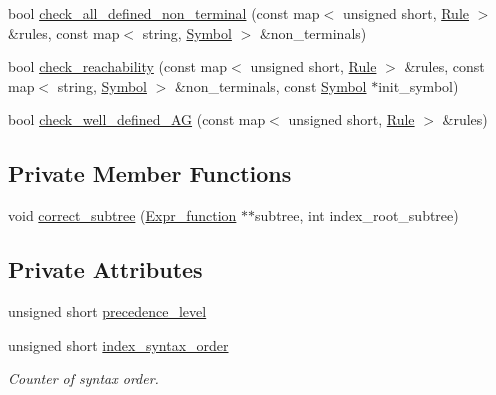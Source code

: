 \begin{CompactItemize}
\item 
bool \hyperlink{classgenevalmag_1_1Semantics__checks_bb0a26862b6134eeb10f55b701ded180}{check\_\-all\_\-defined\_\-non\_\-terminal} (const map$<$ unsigned short, \hyperlink{classgenevalmag_1_1Rule}{Rule} $>$ \&rules, const map$<$ string, \hyperlink{classgenevalmag_1_1Symbol}{Symbol} $>$ \&non\_\-terminals)
\item 
bool \hyperlink{classgenevalmag_1_1Semantics__checks_6d2a6d53c499f3e7abbd19ecbc0d69d5}{check\_\-reachability} (const map$<$ unsigned short, \hyperlink{classgenevalmag_1_1Rule}{Rule} $>$ \&rules, const map$<$ string, \hyperlink{classgenevalmag_1_1Symbol}{Symbol} $>$ \&non\_\-terminals, const \hyperlink{classgenevalmag_1_1Symbol}{Symbol} $\ast$init\_\-symbol)
\item 
bool \hyperlink{classgenevalmag_1_1Semantics__checks_7234750d25c375989dfc9318e081571d}{check\_\-well\_\-defined\_\-AG} (const map$<$ unsigned short, \hyperlink{classgenevalmag_1_1Rule}{Rule} $>$ \&rules)
\end{CompactItemize}
\subsection*{Private Member Functions}
\begin{CompactItemize}
\item 
void \hyperlink{classgenevalmag_1_1Semantics__checks_e7d4a6bbf2eebde377bc386983f61002}{correct\_\-subtree} (\hyperlink{classgenevalmag_1_1Expr__function}{Expr\_\-function} $\ast$$\ast$subtree, int index\_\-root\_\-subtree)
\end{CompactItemize}
\subsection*{Private Attributes}
\begin{CompactItemize}
\item 
unsigned short \hyperlink{classgenevalmag_1_1Semantics__checks_e69cd5c1a7b7d2cfa05c370617a8d58f}{precedence\_\-level}
\item 
unsigned short \hyperlink{classgenevalmag_1_1Semantics__checks_7dcdb23df315da76ae288462e3427591}{index\_\-syntax\_\-order}
\begin{CompactList}\small\item\em Counter of syntax order. \item\end{CompactList}\end{CompactItemize}


